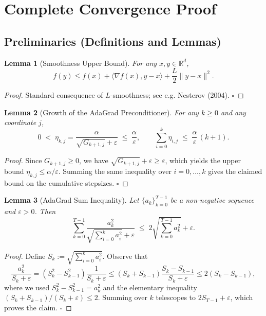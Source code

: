 \documentclass{article}
\newtheorem{lemma}{Lemma}
\newcommand{\R}{\mathbb{R}}
\begin{document}
\section*{Complete Convergence Proof}

\subsection*{Preliminaries (Definitions and Lemmas)}
\begin{lemma}[Smoothness Upper Bound]\label{lem:smooth}
For any $x,y\in\R^{d}$,
\[
f(y)\le f(x)+\langle\nabla f(x),y-x\rangle+\frac{L}{2}\|y-x\|^{2}.
\]
\end{lemma}
\begin{proof}
Standard consequence of $L$‑smoothness; see e.g. Nesterov (2004). \hfill $\square$
\end{proof}

\begin{lemma}[Growth of the AdaGrad Preconditioner]\label{lem:precond}
For any $k\ge0$ and any coordinate $j$,
\[
0\;<\;\eta_{k,j}= \frac{\alpha}{\sqrt{G_{k+1,j}}+\varepsilon}\;\le\;\frac{\alpha}{\varepsilon},
\qquad
\sum_{i=0}^{k}\eta_{i,j}\;\le\;\frac{\alpha}{\varepsilon}\,(k+1).
\]
\end{lemma}
\begin{proof}
Since $G_{k+1,j}\ge0$, we have $\sqrt{G_{k+1,j}}+\varepsilon\ge\varepsilon$, which yields the
upper bound $\eta_{k,j}\le\alpha/\varepsilon$.  Summing the same inequality over $i=0,\dots,k$
gives the claimed bound on the cumulative stepsizes.  %
\hfill $\square$
\end{proof}

\begin{lemma}[AdaGrad Sum Inequality]\label{lem:adagrad-sum}
Let $\{a_{k}\}_{k=0}^{T-1}$ be a non‑negative sequence and $\varepsilon>0$.
Then
\[
\sum_{k=0}^{T-1}\frac{a_{k}^{2}}{\sqrt{\sum_{i=0}^{k}a_{i}^{2}}+\varepsilon}
\;\le\;2\sqrt{\sum_{k=0}^{T-1}a_{k}^{2}}+\varepsilon .
\]
\end{lemma}
\begin{proof}
Define $S_{k}:=\sqrt{\sum_{i=0}^{k}a_{i}^{2}}$.  Observe that
\[
\frac{a_{k}^{2}}{S_{k}+\varepsilon}
= (S_{k}^{2}-S_{k-1}^{2})\frac{1}{S_{k}+\varepsilon}
\le (S_{k}+S_{k-1})\frac{S_{k}-S_{k-1}}{S_{k}+\varepsilon}
\le 2(S_{k}-S_{k-1}),
\]
where we used $S_{k}^{2}-S_{k-1}^{2}=a_{k}^{2}$ and the elementary inequality
$(S_{k}+S_{k-1})/(S_{k}+\varepsilon)\le 2$.  Summing over $k$ telescopes to
$2S_{T-1}+\varepsilon$, which proves the claim. \hfill $\square$
\end{proof}
\end{document}
